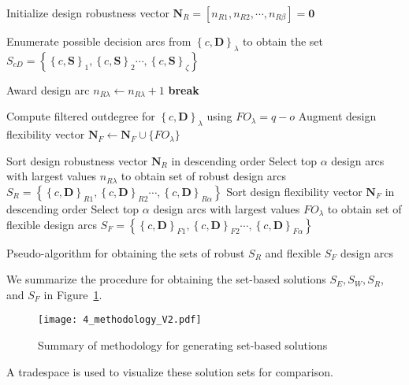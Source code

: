 \begin{algorithm}
	\DontPrintSemicolon %
	Initialize design robustness vector $\mathbf{N}_R = \left[n_{R1},n_{R2},\cdots,n_{R\beta}\right] = \mathbf{0}$\;	
	 {
		Enumerate possible decision arcs from $\left\{c,\mathbf{D}\right\}_\lambda$ to obtain the set $S_{cD} = \left\{\left\{c,\mathbf{S}\right\}_{1},\left\{c,\mathbf{S}\right\}_{2}\cdots,\left\{c,\mathbf{S}\right\}_{\zeta}\right\}$\;
		 {
			 {
				
				 {
					Award design arc $n_{R\lambda} \gets n_{R\lambda} + 1$\;
					\textbf{break}
				}
			
			}
		}
		Compute filtered outdegree for $\left\{c,\mathbf{D}\right\}_\lambda$ using $FO_{\lambda} = q - o$\;
		Augment design flexibility vector $\mathbf{N}_F \gets \mathbf{N}_F \cup \{ FO_{\lambda} \} $\;
	}
	Sort design robustness vector $\mathbf{N}_R$ in descending order\;
	Select top $\alpha$ design arcs with largest values $n_{R\lambda}$ to obtain set of robust design arcs $S_R = \left\{\left\{c,\mathbf{D}\right\}_{R1},\left\{c,\mathbf{D}\right\}_{R2}\cdots,\left\{c,\mathbf{D}\right\}_{R\alpha}\right\}$\;
	Sort design flexibility vector $\mathbf{N}_F$ in descending order\;
	Select top $\alpha$ design arcs with largest values $FO_{\lambda}$ to obtain set of flexible design arcs $S_F = \left\{\left\{c,\mathbf{D}\right\}_{F1},\left\{c,\mathbf{D}\right\}_{F2}\cdots,\left\{c,\mathbf{D}\right\}_{F\alpha}\right\}$\;
	\caption{Pseudo-algorithm for obtaining the sets of robust $S_{R}$ and flexible $S_{F}$ design arcs}
	\label{algo:SBDRobustalgo}
\end{algorithm}

We summarize the procedure for obtaining the set-based solutions $S_E,S_W,S_R$, and $S_F$ in Figure~\ref{fig:methodology}.

\begin{figure}[h!]
	\centering
	\texttt{[image: 4\_methodology\_V2.pdf]}
	\caption{Summary of methodology for generating set-based solutions}
	\label{fig:methodology}
\end{figure}

A tradespace is used to visualize these solution sets for comparison.

